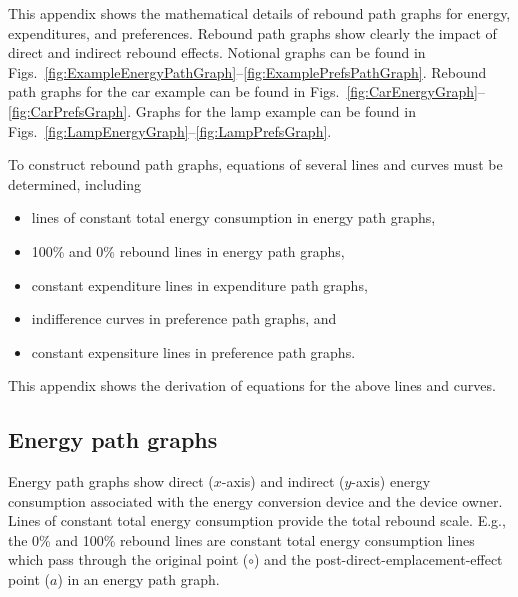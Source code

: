 
This appendix shows the mathematical details of rebound path graphs
for energy, expenditures, and preferences.
Rebound path graphs show clearly the impact of direct and indirect rebound effects.
Notional graphs can be found in 
Figs.~\ref{fig:ExampleEnergyPathGraph}--\ref{fig:ExamplePrefsPathGraph}.
Rebound path graphs for the car example can be found in 
Figs.~\ref{fig:CarEnergyGraph}--\ref{fig:CarPrefsGraph}.
Graphs for the lamp example can be found in
Figs.~\ref{fig:LampEnergyGraph}--\ref{fig:LampPrefsGraph}.

To construct rebound path graphs, equations of several lines and curves 
must be determined, including
%
\begin{itemize}

  \item lines of constant total energy consumption
        in energy path graphs, 
        
  \item 100\% and 0\% rebound lines in energy path graphs, 
  
  \item constant expenditure lines in expenditure path graphs,
  
  \item indifference curves in preference path graphs, and 
  
  \item constant expensiture lines in preference path graphs.

\end{itemize}
%
This appendix shows the derivation of equations for the above lines and curves.

\subsection{Energy path graphs}
\label{sec:energy_path_graph_details}

Energy path graphs show direct ($x$-axis) and indirect ($y$-axis)
energy consumption associated with the energy conversion device 
and the device owner.
Lines of constant total energy consumption provide the total rebound scale.
E.g., the 0\% and 100\% rebound lines are constant total energy consumption
lines which pass through the original point ($\circ$) and
the post-direct-emplacement-effect point ($a$) in an energy path graph.

